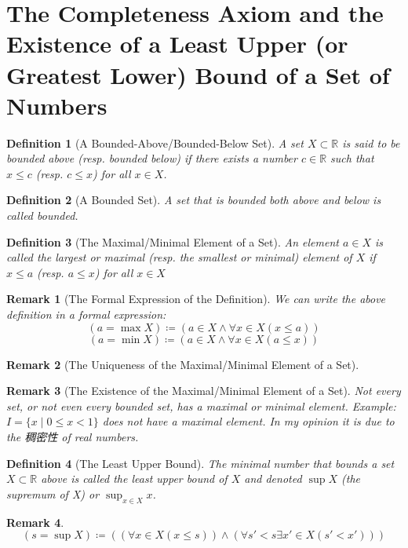 \documentclass[onecolumn]{ctexart}
\newtheorem{definition}{Definition}
\newtheorem{remark}{Remark}
\begin{document}
\section{The Completeness Axiom and the Existence of a Least Upper (or Greatest Lower) Bound of a Set of Numbers}

\begin{definition}[A Bounded-Above/Bounded-Below Set]
  A set $X \subset \mathbb{R}$ is said to be bounded above (resp. bounded below) 
  if there exists a number $c \in \mathbb{R}$ such that $x \leq c$ (resp. $c 
  \leq x$) for all $x \in X$.
\end{definition}

\begin{definition}[A Bounded Set]
  A set that is bounded both above and below is called bounded.
\end{definition}

\begin{definition}[The Maximal/Minimal Element of a Set]
  An element $a \in X$ is called the largest or maximal (resp. the smallest or 
  minimal) element of $X$ if $x \leq a$ (resp. $a \leq x$) for all $x \in X$
\end{definition}
\begin{remark}[The Formal Expression of the Definition]
  We can write the above definition in a formal expression:
  \[
    (a = \max X) \coloneqq (a \in X \wedge \forall x \in X (x \leq a))
  \]
  \[
    (a = \min X) \coloneqq (a \in X \wedge \forall x \in X (a \leq x))
  \]
\end{remark}
\begin{remark}[The Uniqueness of the Maximal/Minimal Element of a Set]
  
\end{remark}
\begin{remark}[The Existence of the Maximal/Minimal Element of a Set]
  Not every set, or not even every bounded set, has a maximal or minimal element.
  Example: $I = \lbrace x \mid 0 \leq x < 1 \rbrace$ does not have a maximal 
  element. In my opinion it is due to the 稠密性 of real numbers.
\end{remark}

\begin{definition}[The Least Upper Bound]
  The minimal number that bounds a set $X \subset \mathbb{R}$ above is called 
  the least upper bound of $X$ and denoted $\sup X$ (the supremum of X) or 
  $\sup_{x \in X} x$.
\end{definition}
\begin{remark}
  \[
    (s = \sup X) \coloneqq ((\forall x \in X (x \leq s)) \wedge (\forall s' < s \exists x' \in X (s' < x')))
  \]
\end{remark}
\end{document}

